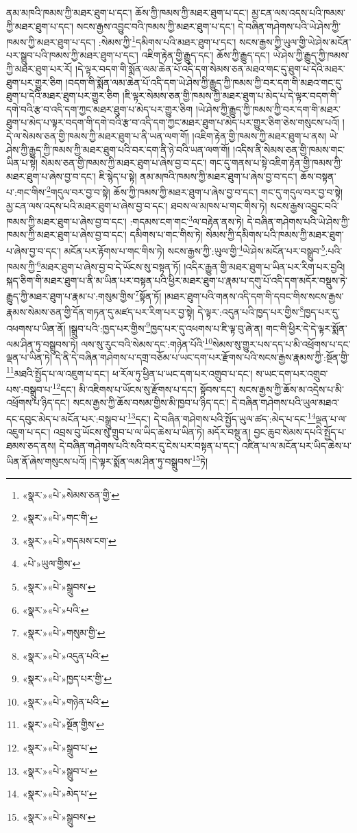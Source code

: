 ནམ་མཁའི་ཁམས་ཀྱི་མཐར་ཐུག་པ་དང་། ཆོས་ཀྱི་ཁམས་ཀྱི་མཐར་ཐུག་པ་དང་། མྱ་ངན་ལས་འདས་པའི་ཁམས་ཀྱི་མཐར་ཐུག་པ་དང་། སངས་རྒྱས་འབྱུང་བའི་ཁམས་ཀྱི་མཐར་ཐུག་པ་དང་། དེ་བཞིན་གཤེགས་པའི་ཡེ་ཤེས་ཀྱི་ཁམས་ཀྱི་མཐར་ཐུག་པ་དང་། :སེམས་ཀྱི་\footnote{«སྣར་»«པེ་»སེམས་ཅན་གྱི་}དམིགས་པའི་མཐར་ཐུག་པ་དང་། སངས་རྒྱས་ཀྱི་ཡུལ་གྱི་ཡེ་ཤེས་མངོན་པར་སྒྲུབ་པའི་ཁམས་ཀྱི་མཐར་ཐུག་པ་དང་། འཇིག་རྟེན་གྱི་རྒྱུད་དང་། ཆོས་ཀྱི་རྒྱུད་དང་། ཡེ་ཤེས་ཀྱི་རྒྱུད་ཀྱི་ཁམས་ཀྱི་མཐར་ཐུག་པར་རོ། །དེ་ལྟར་བདག་གི་སྨོན་ལམ་ཆེན་པོ་འདི་དག་སེམས་ཅན་མཐའ་གང་དུ་ཐུག་པ་དེའི་མཐར་ཐུག་པར་གྱུར་ཅིག །བདག་གི་སྨོན་ལམ་ཆེན་པོ་འདི་དག་ཡེ་ཤེས་ཀྱི་རྒྱུད་ཀྱི་ཁམས་ཀྱི་བར་དག་གི་མཐའ་གང་དུ་ཐུག་པ་དེའི་མཐར་ཐུག་པར་གྱུར་ཅིག །ཇི་ལྟར་སེམས་ཅན་གྱི་ཁམས་ཀྱི་མཐར་ཐུག་པ་མེད་པ་དེ་ལྟར་བདག་གི་དགེ་བའི་རྩ་བ་འདི་དག་ཀྱང་མཐར་ཐུག་པ་མེད་པར་གྱུར་ཅིག །ཡེ་ཤེས་ཀྱི་རྒྱུད་ཀྱི་ཁམས་ཀྱི་བར་དག་གི་མཐར་ཐུག་པ་མེད་པ་ལྟར་བདག་གི་དགེ་བའི་རྩ་བ་འདི་དག་ཀྱང་མཐར་ཐུག་པ་མེད་པར་གྱུར་ཅིག་ཅེས་གསུངས་པའོ། །དེ་ལ་སེམས་ཅན་གྱི་ཁམས་ཀྱི་མཐར་ཐུག་པ་ནི་ཡན་ལག་གོ། །འཇིག་རྟེན་གྱི་ཁམས་ཀྱི་མཐར་ཐུག་པ་ནས། ཡེ་ཤེས་ཀྱི་རྒྱུད་ཀྱི་ཁམས་ཀྱི་མཐར་ཐུག་པའི་བར་དག་ནི་ཉེ་བའི་ཡན་ལག་གོ། །འདིས་ནི་སེམས་ཅན་གྱི་ཁམས་གང་ཡིན་པ་སྟེ། སེམས་ཅན་གྱི་ཁམས་ཀྱི་མཐར་ཐུག་པ་ཞེས་བྱ་བ་དང་། གང་དུ་གནས་པ་སྟེ་འཇིག་རྟེན་གྱི་ཁམས་ཀྱི་མཐར་ཐུག་པ་ཞེས་བྱ་བ་དང་། ཇི་སྙེད་པ་སྟེ། ནམ་མཁའི་ཁམས་ཀྱི་མཐར་ཐུག་པ་ཞེས་བྱ་བ་དང་། ཆོས་བསྟན་པ་:གང་གིས་\footnote{«སྣར་»«པེ་»གང་གི་}གདུལ་བར་བྱ་བ་སྟེ། ཆོས་ཀྱི་ཁམས་ཀྱི་མཐར་ཐུག་པ་ཞེས་བྱ་བ་དང་། གང་དུ་གདུལ་བར་བྱ་བ་སྟེ། མྱ་ངན་ལས་འདས་པའི་མཐར་ཐུག་པ་ཞེས་བྱ་བ་དང་། ཐབས་ལ་མཁས་པ་གང་གིས་ཏེ། སངས་རྒྱས་འབྱུང་བའི་ཁམས་ཀྱི་མཐར་ཐུག་པ་ཞེས་བྱ་བ་དང་། :གདམས་ངག་གང་\footnote{«སྣར་»«པེ་»གདམས་ངག་}ལ་བརྟེན་ནས་ཏེ། དེ་བཞིན་གཤེགས་པའི་ཡེ་ཤེས་ཀྱི་ཁམས་ཀྱི་མཐར་ཐུག་པ་ཞེས་བྱ་བ་དང་། དམིགས་པ་གང་གིས་ཏེ། སེམས་ཀྱི་དམིགས་པའི་ཁམས་ཀྱི་མཐར་ཐུག་པ་ཞེས་བྱ་བ་དང་། མངོན་པར་རྟོགས་པ་གང་གིས་ཏེ། སངས་རྒྱས་ཀྱི་:ཡུལ་གྱི་\footnote{«པེ་»ཡུལ་གྱིས་}ཡེ་ཤེས་མངོན་པར་བསྒྲུབ་\footnote{«སྣར་»«པེ་»སྒྲུབས་}:པའི་ཁམས་ཀྱི་\footnote{«སྣར་»«པེ་»པའི་}མཐར་ཐུག་པ་ཞེས་བྱ་བ་དེ་ཡོངས་སུ་བསྟན་ཏོ། །འདིར་རྒྱུན་གྱི་མཐར་ཐུག་པ་ཡིན་པར་རིག་པར་བྱའི། སྐད་ཅིག་གི་མཐར་ཐུག་པ་ནི་མ་ཡིན་པར་བསྟན་པའི་ཕྱིར་མཐར་ཐུག་པ་རྣམ་པ་དགུ་པོ་འདི་དག་མདོར་བསྡུས་ཏེ་རྒྱུད་ཀྱི་མཐར་ཐུག་པ་རྣམ་པ་:གསུམ་གྱིས་\footnote{«སྣར་»«པེ་»གསུམ་གྱི་}སྟོན་ཏོ། །མཐར་ཐུག་པའི་གནས་འདི་དག་གི་དབང་གིས་སངས་རྒྱས་རྣམས་སེམས་ཅན་གྱི་དོན་གཏན་དུ་མཛད་པར་རིག་པར་བྱ་སྟེ། དེ་ལྟར་:འདུན་པའི་ཁྱད་པར་གྱིས་\footnote{«སྣར་»«པེ་»འདུན་པའི་}ཁྱད་པར་དུ་འཕགས་པ་ཡིན་ནོ། །སྒྲུབ་པའི་:ཁྱད་པར་གྱིས་\footnote{«སྣར་»«པེ་»ཁྱད་པར་གྱི་}ཁྱད་པར་དུ་འཕགས་པ་ཇི་ལྟ་བུ་ཞེ་ན། གང་གི་ཕྱིར་དེ་དེ་ལྟར་སྨོན་ལམ་ཤིན་ཏུ་བསྒྲུབས་ཏེ། ལས་སུ་རུང་བའི་སེམས་དང་:གཉེན་པོའི་\footnote{«སྣར་»«པེ་»གཉེན་པའི་}སེམས་སུ་གྱུར་པས་དད་པ་མི་འཕྲོགས་པ་དང་ལྡན་པ་ཡིན་ཏེ། དེ་ནི་དེ་བཞིན་གཤེགས་པ་དགྲ་བཅོམ་པ་ཡང་དག་པར་རྫོགས་པའི་སངས་རྒྱས་རྣམས་ཀྱི་:སྔོན་གྱི་\footnote{«སྣར་»«པེ་»སྔོན་གྱིས་}མཐའི་སྤྱོད་པ་ལ་འཇུག་པ་དང་། ཕ་རོལ་ཏུ་ཕྱིན་པ་ཡང་དག་པར་འགྲུབ་པ་དང་། ས་ཡང་དག་པར་འགྲུབ་པས་:བསྒྲུབ་པ་\footnote{«སྣར་»«པེ་»སྒྲུབ་པ་}དང་། མི་འཇིགས་པ་ཡོངས་སུ་རྫོགས་པ་དང་། སྟོབས་དང་། སངས་རྒྱས་ཀྱི་ཆོས་མ་འདྲེས་པ་མི་འཕྲོགས་པ་ཉིད་དང་། སངས་རྒྱས་ཀྱི་ཆོས་བསམ་གྱིས་མི་ཁྱབ་པ་ཉིད་དང་། དེ་བཞིན་གཤེགས་པའི་ཡུལ་མཐའ་དང་དབུང་མེད་པ་མངོན་པར་:བསྒྲུབ་པ་\footnote{«སྣར་»«པེ་»སྒྲུབ་པ་}དང་། དེ་བཞིན་གཤེགས་པའི་སྤྱོད་ཡུལ་ཚད་:མེད་པ་དང་\footnote{«སྣར་»«པེ་»མེད་པ་}ལྡན་པ་ལ་འཇུག་པ་དང་། འབྲས་བུ་ཡོངས་སུ་གྲུབ་པ་ལ་ཡིད་ཆེས་པ་ཡིན་ཏེ། མདོར་བསྡུ་ན། བྱང་ཆུབ་སེམས་དཔའི་སྤྱོད་པ་ཐམས་ཅད་ནས། དེ་བཞིན་གཤེགས་པའི་སའི་བར་དུ་ངེས་པར་བསྟན་པ་དང་། འཛིན་པ་ལ་མངོན་པར་ཡིད་ཆེས་པ་ཡིན་ནོ་ཞེས་གསུངས་པའོ། །དེ་ལྟར་སྨོན་ལམ་ཤིན་ཏུ་བསྒྲུབས་\footnote{«སྣར་»«པེ་»སྒྲུབས་}ཏེ། 